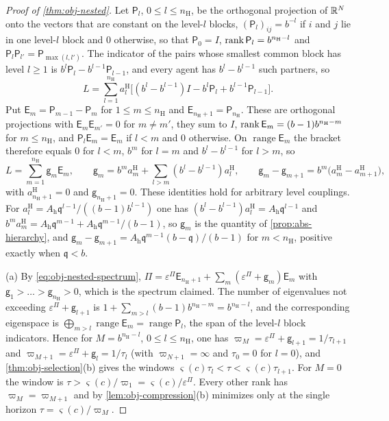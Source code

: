 \begin{proof}[Proof of \cref{thm:obj-nested}]
Let $\mathsf P_l$, $0\le l\le n_{\mathrm H}$, be the orthogonal projection of $\mathbb{R}^N$ onto the vectors that are constant on the level-$l$ blocks, $(\mathsf P_l)_{ij}=b^{-l}$ if $i$ and $j$ lie in one level-$l$ block and $0$ otherwise, so that $\mathsf P_0=I$, $\operatorname{rank}\mathsf P_l=b^{n_{\mathrm H}-l}$ and $\mathsf P_l\mathsf P_{l'}=\mathsf P_{\max(l,l')}$. The indicator of the pairs whose smallest common block has level $l\ge1$ is $b^l\mathsf P_l-b^{l-1}\mathsf P_{l-1}$, and every agent has $b^l-b^{l-1}$ such partners, so
\[
L=\sum_{l=1}^{n_{\mathrm H}}a^{\mathrm H}_l\bigl[(b^l-b^{l-1})I-b^l\mathsf P_l+b^{l-1}\mathsf P_{l-1}\bigr].
\]
Put $\mathsf E_m=\mathsf P_{m-1}-\mathsf P_m$ for $1\le m\le n_{\mathrm H}$ and $\mathsf E_{n_{\mathrm H}+1}=\mathsf P_{n_{\mathrm H}}$. These are orthogonal projections with $\mathsf E_m\mathsf E_{m'}=0$ for $m\ne m'$, they sum to $I$, $\operatorname{rank}\mathsf E_m=(b-1)b^{n_{\mathrm H}-m}$ for $m\le n_{\mathrm H}$, and $\mathsf P_l\mathsf E_m=\mathsf E_m$ if $l<m$ and $0$ otherwise. On $\operatorname{range}\mathsf E_m$ the bracket therefore equals $0$ for $l<m$, $b^m$ for $l=m$ and $b^l-b^{l-1}$ for $l>m$, so
\begin{equation}\label{eq:obj-nested-spectrum}
L=\sum_{m=1}^{n_{\mathrm H}}\mathsf g_m\mathsf E_m,\qquad\mathsf g_m=b^ma^{\mathrm H}_m+\sum_{l>m}(b^l-b^{l-1})a^{\mathrm H}_l,\qquad\mathsf g_m-\mathsf g_{m+1}=b^m\bigl(a^{\mathrm H}_m-a^{\mathrm H}_{m+1}\bigr),
\end{equation}
with $a^{\mathrm H}_{n_{\mathrm H}+1}=0$ and $\mathsf g_{n_{\mathrm H}+1}=0$. These identities hold for arbitrary level couplings. For $a^{\mathrm H}_l=A_{\mathrm h}\mathfrak q^{l-1}/((b-1)b^{l-1})$ one has $(b^l-b^{l-1})a^{\mathrm H}_l=A_{\mathrm h}\mathfrak q^{l-1}$ and $b^ma^{\mathrm H}_m=A_{\mathrm h}\mathfrak q^{m-1}+A_{\mathrm h}\mathfrak q^{m-1}/(b-1)$, so $\mathsf g_m$ is the quantity of \cref{prop:abs-hierarchy}, and $\mathsf g_m-\mathsf g_{m+1}=A_{\mathrm h}\mathfrak q^{m-1}(b-\mathfrak q)/(b-1)$ for $m<n_{\mathrm H}$, positive exactly when $\mathfrak q<b$.

(a) By \eqref{eq:obj-nested-spectrum}, $\Pi=\varepsilon^\Pi\mathsf E_{n_{\mathrm H}+1}+\sum_m(\varepsilon^\Pi+\mathsf g_m)\mathsf E_m$ with $\mathsf g_1>\dots>\mathsf g_{n_{\mathrm H}}>0$, which is the spectrum claimed. The number of eigenvalues not exceeding $\varepsilon^\Pi+\mathsf g_{l+1}$ is $1+\sum_{m>l}(b-1)b^{n_{\mathrm H}-m}=b^{n_{\mathrm H}-l}$, and the corresponding eigenspace is $\bigoplus_{m>l}\operatorname{range}\mathsf E_m=\operatorname{range}\mathsf P_l$, the span of the level-$l$ block indicators. Hence for $M=b^{n_{\mathrm H}-l}$, $0\le l\le n_{\mathrm H}$, one has $\varpi_M=\varepsilon^\Pi+\mathsf g_{l+1}=1/\tau_{l+1}$ and $\varpi_{M+1}=\varepsilon^\Pi+\mathsf g_l=1/\tau_l$ (with $\varpi_{N+1}=\infty$ and $\tau_0=0$ for $l=0$), and \cref{thm:obj-selection}(b) gives the windows $\varsigma(c)\tau_l<\tau<\varsigma(c)\tau_{l+1}$. For $M=0$ the window is $\tau>\varsigma(c)/\varpi_1=\varsigma(c)/\varepsilon^\Pi$. Every other rank has $\varpi_M=\varpi_{M+1}$ and by \cref{lem:obj-compression}(b) minimizes only at the single horizon $\tau=\varsigma(c)/\varpi_M$.


\end{proof}
